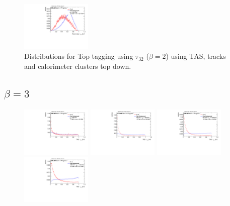 \begin{figure}
\includegraphics[width=0.3\textwidth]{sascha_input/Appendix/Distributions/top/distributions/beta2/h_recoJet_nSub32_2_bin6.pdf}
\caption{\footnotesize{Distributions for Top tagging using $\tau_{32}$ ($\beta=2$) using TAS, tracks and calorimeter clusters top down.}}
\end{figure}

\subsection*{$\beta=3$}
\begin{figure}
\includegraphics[width=0.3\textwidth]{sascha_input/Appendix/Distributions/top/distributions/beta3/h_assisted_tj_nSub32_3_bin1.pdf} \hspace{1mm}
\includegraphics[width=0.3\textwidth]{sascha_input/Appendix/Distributions/top/distributions/beta3/h_assisted_tj_nSub32_3_bin2.pdf} \hspace{1mm}
\includegraphics[width=0.3\textwidth]{sascha_input/Appendix/Distributions/top/distributions/beta3/h_assisted_tj_nSub32_3_bin3.pdf} 
\bigskip
\includegraphics[width=0.3\textwidth]{sascha_input/Appendix/Distributions/top/distributions/beta3/h_assisted_tj_nSub32_3_bin4.pdf} \hspace{1mm}

\end{figure}
